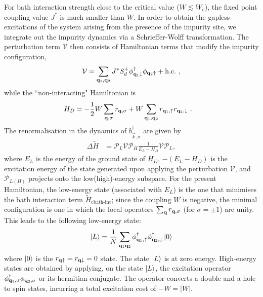 For bath interaction strength close to the critical value (\(W \lesssim W_c\)), the fixed point coupling value \(J^*\) is much smaller than \(W\). In order to obtain the gapless excitations of the system arising from the presence of the impurity site, we integrate out the impurity dynamics via a Schrieffer-Wolff transformation. The perturbation term \(\mathcal{V}\) then consists of Hamiltonian terms that modify the impurity configuration,
\begin{equation}\begin{aligned}
	\mathcal{V} = \sum_{{\bf q}_1, {\bf q}_2}J^*{S}_d^+{\phi}^\dagger_{{\bf q}_1 \downarrow} \phi_{{\bf q}_2 \uparrow} + \text{h.c.}~,
\end{aligned}\end{equation}
while the ``non-interacting" Hamiltonian is
\begin{equation}\begin{aligned}
	H_D &= -\frac{1}{2}W\sum_{{\bf q},\sigma}r_{{\bf q},\sigma} + W\sum_{{\bf q}_1,{\bf q}_2}r_{{\bf q}_1,\uparrow} r_{{\bf q}_2,\downarrow}~.
\end{aligned}\end{equation}
The renormalisation in the dynamics of \(b^\dagger_{\vec k,\sigma}\) are given by
\begin{equation}\begin{aligned}
	\Delta \tilde H &= \mathcal{P}_L \mathcal{V} \mathcal{P}_H\frac{1}{E_L - H_D} \mathcal{V} \mathcal{P}_L,
\end{aligned}\end{equation}
where \(E_L\) is the energy of the ground state of \(H_D\), \(-(E_L - H_D)\) is the excitation energy of the state generated upon applying the perturbation \(\mathcal{V}\), and \(\mathcal{P}_{L(H)}\) projects onto the low(high)-energy subspace. For the present Hamiltonian, the low-energy state (associated with \(E_L\)) is the one that minimises the bath interaction term \(\tilde H_\text{cbath-int}\); since the coupling \(W\) is negative, the minimal configuration is one in which the local operators \(\sum_{{\bf q}}r_{{\bf q},\sigma}\) (for \(\sigma=\pm 1\)) are unity. This leads to the following low-energy state:
\begin{equation}\begin{aligned}
	\ket{L} = \frac{1}{N}\sum_{{\bf q}_1{\bf q}_2}\phi^\dagger_{{\bf q}_1, \uparrow}\phi^\dagger_{{\bf q}_2, \downarrow} \ket{0}
\end{aligned}\end{equation}
where \(\ket{0}\) is the \(r_{{\bf q} \uparrow} = r_{{\bf q} \downarrow} = 0\) state. The state \(\ket{L}\) is at zero energy. High-energy states are obtained by applying, on the state \(\ket{L}\), the excitation operator \(\phi^\dagger_{{\bf q}_1,\sigma}\phi_{{\bf q}_2,\bar\sigma}\) or its hermitian conjugate. The operator converts a double and a hole to spin states, incurring a total excitation cost of \(-W = |W|\).

